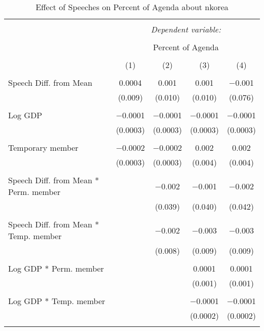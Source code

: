 
\begin{table}[!htbp] \centering 
  \caption{Effect of Speeches on Percent of Agenda about nkorea} 
  \label{} 
\begin{tabular}{@{\extracolsep{5pt}}lcccc} 
\\[-1.8ex]\hline 
\hline \\[-1.8ex] 
 & \multicolumn{4}{c}{\textit{Dependent variable:}} \\ 
\cline{2-5} 
\\[-1.8ex] & \multicolumn{4}{c}{Percent of Agenda} \\ 
\\[-1.8ex] & (1) & (2) & (3) & (4)\\ 
\hline \\[-1.8ex] 
 Speech Diff. from Mean & 0.0004 & 0.001 & 0.001 & $-$0.001 \\ 
  & (0.009) & (0.010) & (0.010) & (0.076) \\ 
  & & & & \\ 
 Log GDP & $-$0.0001 & $-$0.0001 & $-$0.0001 & $-$0.0001 \\ 
  & (0.0003) & (0.0003) & (0.0003) & (0.0003) \\ 
  & & & & \\ 
 Temporary member & $-$0.0002 & $-$0.0002 & 0.002 & 0.002 \\ 
  & (0.0003) & (0.0003) & (0.004) & (0.004) \\ 
  & & & & \\ 
 Speech Diff. from Mean * Perm. member &  & $-$0.002 & $-$0.001 & $-$0.002 \\ 
  &  & (0.039) & (0.040) & (0.042) \\ 
  & & & & \\ 
 Speech Diff. from Mean * Temp. member &  & $-$0.002 & $-$0.003 & $-$0.003 \\ 
  &  & (0.008) & (0.009) & (0.009) \\ 
  & & & & \\ 
 Log GDP * Perm. member &  &  & 0.0001 & 0.0001 \\ 
  &  &  & (0.001) & (0.001) \\ 
  & & & & \\ 
 Log GDP * Temp. member &  &  & $-$0.0001 & $-$0.0001 \\ 
  &  &  & (0.0002) & (0.0002) \\ 
  & & & & \\ 

\end{tabular}
\end{table}
